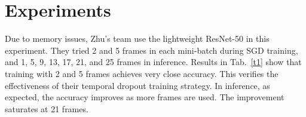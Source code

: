 \documentclass[10pt,twocolumn,letterpaper]{article}
\begin{document}
\section{Experiments}

Due to memory issues, Zhu's team use the lightweight ResNet-50 in this experiment. They tried 2 and 5 frames in each mini-batch during SGD training, and 1, 5, 9, 13, 17, 21, and 25 frames in inference. Results in Tab.~\ref{t1} show that training with 2 and 5 frames achieves very close accuracy. This verifies the effectiveness of their temporal dropout training strategy. In inference, as expected, the accuracy improves as more frames are used. The improvement saturates at 21 frames.




{\small


}
\end{document}
